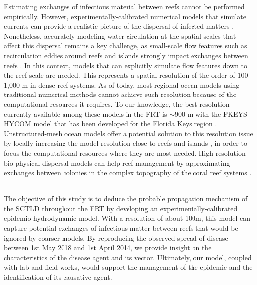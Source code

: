 \documentclass[utf8]{frontiersSCNS}
\newcommand{\dobby}[1]{\textbf{\color{violet}{#1}}}
\begin{document}
\dobby{Hydrodynamic modeling:} Estimating exchanges of infectious material between reefs cannot be performed empirically. However, experimentally-calibrated numerical models that simulate currents can provide a realistic picture of the dispersal of infected matters \dobby{[Insist more on necessity of using models ?]}. Nonetheless, accurately modeling water circulation at the spatial scales that affect this dispersal remains a key challenge, as small-scale flow features such as recirculation eddies around reefs and islands strongly impact exchanges between reefs \citep{wolanski1994physical, burgess2007influence, figueiredo2013synthesizing}. In this context, models that can explicitly simulate flow features down to the reef scale are needed. This represents a spatial resolution of the order of 100-1,000 m in dense reef systems. As of today, most regional ocean models using traditional numerical methods cannot achieve such resolution because of the computational resources it requires. To our knowledge, the best resolution currently available among these models in the FRT is $\sim900$ m with the FKEYS-HYCOM model that has been developed for the Florida Keys region \citep{kourafalou2012florida, sponaugle2012observed, vaz2016perfect}.
Unstructured-mesh ocean models offer a potential solution to this resolution issue by locally increasing the model resolution close to reefs and islands \citep{lambrechts2008multi, thomas2014numerical, thomas2015connectivity}, in order to focus the computational resources where they are most needed. High resolution bio-physical dispersal models can help reef management by approximating exchanges between colonies in the complex topography of the coral reef systems \citep{frys20}. \\
\dobby{Applications of our methodology (= modeling hydro + deduce other things) e.g connectivity ?}\\
\dobby{Other applications of SIR model with hydro/networks ?}


The objective of this study is to deduce the probable propagation mechanism of the SCTLD throughout the FRT by developing an experimentally-calibrated epidemio-hydrodynamic model. With a resolution of about 100m, this model can capture potential exchanges of infectious matter between reefs that would be ignored by coarser models. By reproducing the observed spread of disease between 1st May 2018 and 1st April 2014, we provide insight on the characteristics of the disease agent and its vector. Ultimately, our model, coupled with lab and field works, would support the management of the epidemic and the identification of its causative agent.
\end{document}
